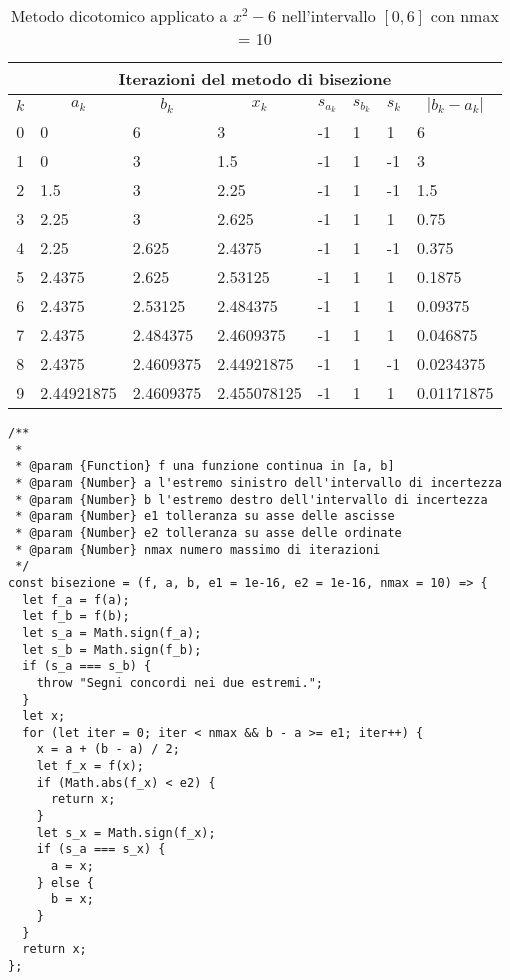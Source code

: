 \documentclass[10pt]{article}
\begin{document}
\begin{table}
    \begin{center}
        \begin{tabular}{|c|*{7}{l|}}\hline
        \multicolumn{8}{|c|}{\bf Iterazioni del metodo di bisezione}\\\hline
        \multicolumn{1}{|c|}{$k$}&
        \multicolumn{1}{|c|}{$a_k$}&
        \multicolumn{1}{|c|}{$b_k$}&
        \multicolumn{1}{|c|}{$x_k$}&
        \multicolumn{1}{|c|}{$s_{a_k}$}&
        \multicolumn{1}{|c|}{$s_{b_k}$}&
        \multicolumn{1}{|c|}{$s_k$}&
        \multicolumn{1}{|c|}{$|b_{k} - a_{k}|$}\\\hline
        0&0&6&3&-1&1&1&6\\
        1&0&3&1.5&-1&1&-1&3\\
        2&1.5&3&2.25&-1&1&-1&1.5\\
        3&2.25&3&2.625&-1&1&1&0.75\\
        4&2.25&2.625&2.4375&-1&1&-1&0.375\\
        5&2.4375&2.625&2.53125&-1&1&1&0.1875\\
        6&2.4375&2.53125&2.484375&-1&1&1&0.09375\\
        7&2.4375&2.484375&2.4609375&-1&1&1&0.046875\\
        8&2.4375&2.4609375&2.44921875&-1&1&-1&0.0234375\\
        9&2.44921875&2.4609375&2.455078125&-1&1&1&0.01171875\\
        \hline
        \end{tabular}
    \end{center}        
    \caption[]{Metodo dicotomico applicato a $x^2 -6$ nell'intervallo $[0, 6]$ con nmax = 10}
\end{table}

\begin{lstlisting}[float]
/**
 *
 * @param {Function} f una funzione continua in [a, b]
 * @param {Number} a l'estremo sinistro dell'intervallo di incertezza
 * @param {Number} b l'estremo destro dell'intervallo di incertezza
 * @param {Number} e1 tolleranza su asse delle ascisse
 * @param {Number} e2 tolleranza su asse delle ordinate
 * @param {Number} nmax numero massimo di iterazioni
 */
const bisezione = (f, a, b, e1 = 1e-16, e2 = 1e-16, nmax = 10) => {
  let f_a = f(a);
  let f_b = f(b);
  let s_a = Math.sign(f_a);
  let s_b = Math.sign(f_b);
  if (s_a === s_b) {
    throw "Segni concordi nei due estremi.";
  }
  let x;
  for (let iter = 0; iter < nmax && b - a >= e1; iter++) {
    x = a + (b - a) / 2;
    let f_x = f(x);
    if (Math.abs(f_x) < e2) {
      return x;
    }
    let s_x = Math.sign(f_x);
    if (s_a === s_x) {
      a = x;
    } else {
      b = x;
    }
  }
  return x;
};
\end{lstlisting}
\end{document}
